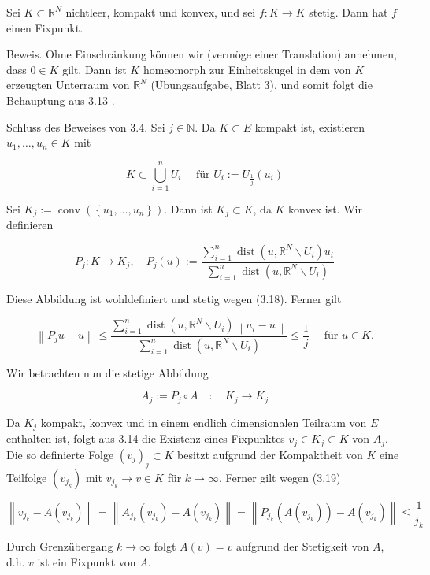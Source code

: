 \documentclass[10pt, letterpaper]{article}
\begin{document}
Sei $K \subset \mathbb{R}^{N}$ nichtleer, kompakt und konvex, und sei $f: K \rightarrow K$ stetig. Dann hat $f$ einen Fixpunkt.

Beweis. Ohne Einschränkung können wir (vermöge einer Translation) annehmen, dass $0 \in K$ gilt. Dann ist $K$ homeomorph zur Einheitskugel in dem von $K$ erzeugten Unterraum von $\mathbb{R}^{N}$ (Übungsaufgabe, Blatt 3), und somit folgt die Behauptung aus 3.13 .

Schluss des Beweises von 3.4. Sei $j \in \mathbb{N}$. Da $K \subset E$ kompakt ist, existieren $u_{1}, \ldots, u_{n} \in K$ mit

$$
K \subset \bigcup_{i=1}^{n} U_{i} \quad \text { für } U_{i}:=U_{\frac{1}{j}}\left(u_{i}\right)
$$

Sei $K_{j}:=\operatorname{conv}\left(\left\{u_{1}, \ldots, u_{n}\right\}\right)$. Dann ist $K_{j} \subset K$, da $K$ konvex ist. Wir definieren

$$
P_{j}: K \rightarrow K_{j}, \quad P_{j}(u):=\frac{\sum_{i=1}^{n} \operatorname{dist}\left(u, \mathbb{R}^{N} \backslash U_{i}\right) u_{i}}{\sum_{i=1}^{n} \operatorname{dist}\left(u, \mathbb{R}^{N} \backslash U_{i}\right)}
$$

Diese Abbildung ist wohldefiniert und stetig wegen (3.18). Ferner gilt

$$
\left\|P_{j} u-u\right\| \leq \frac{\sum_{i=1}^{n} \operatorname{dist}\left(u, \mathbb{R}^{N} \backslash U_{i}\right)\left\|u_{i}-u\right\|}{\sum_{i=1}^{n} \operatorname{dist}\left(u, \mathbb{R}^{N} \backslash U_{i}\right)} \leq \frac{1}{j} \quad \text { für } u \in K .
$$

Wir betrachten nun die stetige Abbildung

$$
A_{j}:=P_{j} \circ A \quad: \quad K_{j} \rightarrow K_{j}
$$

Da $K_{j}$ kompakt, konvex und in einem endlich dimensionalen Teilraum von $E$ enthalten ist, folgt aus 3.14 die Existenz eines Fixpunktes $v_{j} \in K_{j} \subset K$ von $A_{j}$. Die so definierte Folge $\left(v_{j}\right)_{j} \subset K$ besitzt aufgrund der Kompaktheit von $K$ eine Teilfolge $\left(v_{j_{k}}\right)$ mit $v_{j_{k}} \rightarrow v \in K$ für $k \rightarrow \infty$. Ferner gilt wegen (3.19)

$$
\left\|v_{j_{k}}-A\left(v_{j_{k}}\right)\right\|=\left\|A_{j_{k}}\left(v_{j_{k}}\right)-A\left(v_{j_{k}}\right)\right\|=\left\|P_{j_{k}}\left(A\left(v_{j_{k}}\right)\right)-A\left(v_{j_{k}}\right)\right\| \leq \frac{1}{j_{k}}
$$

Durch Grenzübergang $k \rightarrow \infty$ folgt $A(v)=v$ aufgrund der Stetigkeit von $A$, d.h. $v$ ist ein Fixpunkt von $A$.
\end{document}
